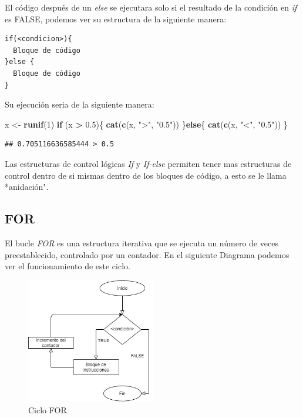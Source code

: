 \documentclass[11pt,]{article}
\newenvironment{Shaded}{\begin{snugshade}}{\end{snugshade}}
\newcommand{\ControlFlowTok}[1]{\textcolor[rgb]{0.13,0.29,0.53}{\textbf{#1}}}
\newcommand{\DecValTok}[1]{\textcolor[rgb]{0.00,0.00,0.81}{#1}}
\newcommand{\FloatTok}[1]{\textcolor[rgb]{0.00,0.00,0.81}{#1}}
\newcommand{\KeywordTok}[1]{\textcolor[rgb]{0.13,0.29,0.53}{\textbf{#1}}}
\newcommand{\NormalTok}[1]{#1}
\newcommand{\OperatorTok}[1]{\textcolor[rgb]{0.81,0.36,0.00}{\textbf{#1}}}
\newcommand{\StringTok}[1]{\textcolor[rgb]{0.31,0.60,0.02}{#1}}
\begin{document}
El código después de un \emph{else} se ejecutara solo si el resultado de
la condición en \emph{if} es FALSE, podemos ver su estructura de la
siguiente manera:

\begin{verbatim}
if(<condicion>){
  Bloque de código
}else {
  Bloque de código
}
\end{verbatim}

Su ejecución seria de la siguiente manera:

\begin{Shaded}
\begin{Highlighting}[]
\NormalTok{x <-}\StringTok{ }\KeywordTok{runif}\NormalTok{(}\DecValTok{1}\NormalTok{)}
\ControlFlowTok{if}\NormalTok{ (x }\OperatorTok{>}\StringTok{ }\FloatTok{0.5}\NormalTok{)\{}
  \KeywordTok{cat}\NormalTok{(}\KeywordTok{c}\NormalTok{(x, }\StringTok{">"}\NormalTok{, }\StringTok{"0.5"}\NormalTok{))}
\NormalTok{\}}\ControlFlowTok{else}\NormalTok{\{}
  \KeywordTok{cat}\NormalTok{(}\KeywordTok{c}\NormalTok{(x, }\StringTok{"<"}\NormalTok{, }\StringTok{"0.5"}\NormalTok{))}
\NormalTok{\}}
\end{Highlighting}
\end{Shaded}

\begin{verbatim}
## 0.705116636585444 > 0.5
\end{verbatim}

Las estructuras de control lógicas \emph{If} y \emph{If-else} permiten
tener mas estructuras de control dentro de si mismas dentro de los
bloques de código, a esto se le llama *anidación".

\hypertarget{for}{%
\subsection{FOR}\label{for}}

El bucle \emph{FOR} es una estructura iterativa que se ejecuta un número
de veces preestablecido, controlado por un contador. En el siguiente
Diagrama podemos ver el funcionamiento de este ciclo.

\begin{figure}
\hypertarget{id}{%
\centering
\includegraphics[width=0.5\textwidth,height=0.3\textheight]{../schemas/FOR.png}
\caption{Ciclo FOR}\label{id}
}
\end{figure}
\end{document}
